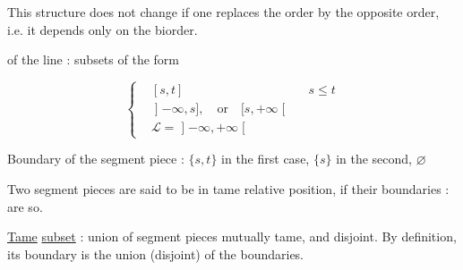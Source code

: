 
This structure does not change if
one replaces the order by the opposite order,
i.e. it depends only on the
biorder.

 


 of the line : subsets
of the form

\[
\left\{\begin{aligned}
 &[s,t] &&s\leq t\\
 &\mathopen{]}-\infty,s],\quad\text{or}\quad [s,+\infty\mathclose{[}\\
 &\mathcal L=\mathopen{]}-\infty,+\infty\mathclose{[}
\end{aligned}\right.
\]

Boundary of the segment piece : $\{s,t\}$ in the
first case, $\{s\}$ in the second, $\varnothing$ 

Two segment pieces are said to be in
tame relative position, if their
boundaries : are so.

\uline{Tame} \uline{subset} :
 union of segment pieces  mutually
tame, and disjoint.  By
definition, its boundary is the union
(disjoint) of the boundaries.

